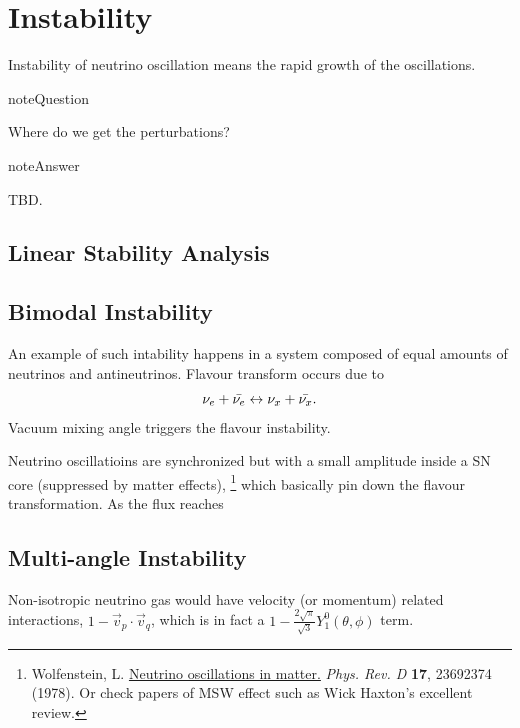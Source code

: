 \documentclass[letterpaper,12pt,english]{sphinxmanual}
\begin{document}
\chapter{Instability}
\label{instability:instability}\label{instability::doc}
Instability of neutrino oscillation means the rapid growth of the oscillations.

\begin{notice}{note}{Question}

Where do we get the perturbations?
\end{notice}

\begin{notice}{note}{Answer}

TBD.
\end{notice}


\section{Linear Stability Analysis}
\label{instability:index-0}\label{instability:linear-stability-analysis}

\section{Bimodal Instability}
\label{instability:bimodal-instability}\label{instability:index-1}
An example of such intability happens in a system composed of equal amounts of neutrinos and antineutrinos. Flavour transform occurs due to
\begin{gather}
\begin{split}\nu_e + \bar{\nu_e} \leftrightarrow \nu_x + \bar{\nu_x}.\end{split}\notag
\end{gather}
Vacuum mixing angle triggers the flavour instability.

Neutrino oscillatioins are synchronized but with a small amplitude inside a SN core (suppressed by matter effects), \footnote[1]{
Wolfenstein, L. \href{http://journals.aps.org/prd/abstract/10.1103/PhysRevD.17.2369}{Neutrino oscillations in matter.} \emph{Phys. Rev. D} \textbf{17}, 23692374 (1978). Or check papers of MSW effect such as Wick Haxton's excellent review.
} which basically pin down the flavour transformation. As the flux reaches


\section{Multi-angle Instability}
\label{instability:index-2}\label{instability:multi-angle-instability}
Non-isotropic neutrino gas would have velocity (or momentum) related interactions, \(1-\vec v_p\cdot\vec v_q\), which is in fact a \(1 -\frac{2\sqrt{\pi}}{\sqrt{3}} Y_1^0(\theta,\phi)\) term.
\end{document}
